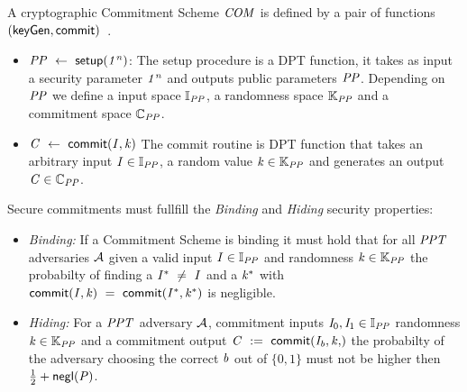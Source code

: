 \begin{definition}\label{def:commitment}
    A cryptographic Commitment Scheme $\mathit{COM}$ is defined by a pair of functions $(\mathsf{keyGen}, \mathsf{commit})$~\cite{bunz2018bulletproofs}.
    \begin{itemize}
        \item $\mathit{PP} ~\leftarrow~ \mathsf{setup} (\mathit{1^n})$: The setup procedure is a DPT function, it takes as input a security parameter $\mathit{1^n}$ and outputs public parameters $\mathit{PP}$.
        Depending on $\mathit{PP}$ we define a input space $\mathbb{I}_{\mathit{PP}}$, a randomness space $\mathbb{K}_{\mathit{PP}}$ and a commitment space $\mathbb{C}_{\mathit{PP}}$.
        \item $\mathit{C} ~\leftarrow~ \mathsf{commit}(\mathit{I}, \mathit{k})$ The commit routine is DPT function that takes an arbitrary input $\mathit{I} \in \mathbb{I}_{\mathit{PP}}$, a random value $\mathit{k} \in \mathbb{K}_{\mathit{PP}}$ and
        generates an output $\mathit{C} \in \mathbb{C}_{\mathit{PP}}$.
    \end{itemize}

    Secure commitments must fullfill the \emph{Binding} and \emph{Hiding} security properties:
    \begin{itemize}
        \item \textit{Binding:} If a Commitment Scheme is binding it must hold that for all $\mathit{PPT}$ adversaries $\mathcal{A}$ given a valid input $\mathit{I} \in \mathbb{I}_{\mathit{PP}}$
        and randomness $\mathit{k} \in \mathbb{K}_{\mathit{PP}}$ the probabilty of finding a $\mathit{I}^* ~\neq~ \mathit{I}$ and a $\mathit{k}^*$ with
        $\mathsf{commit}(\mathit{I}, \mathit{k}) ~=~ \mathsf{commit}(\mathit{I}^*, \mathit{k}^*)$ is negligible.
        \item \textit{Hiding:} For a $\mathit{PPT}$ adversary $\mathcal{A}$, commitment inputs $\mathit{I}_0, \mathit{I}_1 \in \mathbb{I}_{\mathit{PP}}$ randomness $\mathit{k} \in
       \mathbb{K}_{\mathit{PP}}$ and a commitment output $\varCommitment \opAssign \procCommit{\varInput_{\varB}, \varNonce}$ the probabilty of the adversary choosing the correct $\mathit{b}$ out of $\{0,1\}$
        must not be higher then $\frac{1}{2} + \mathsf{negl}(\mathit{P})$.
    \end{itemize}
\end{definition}

